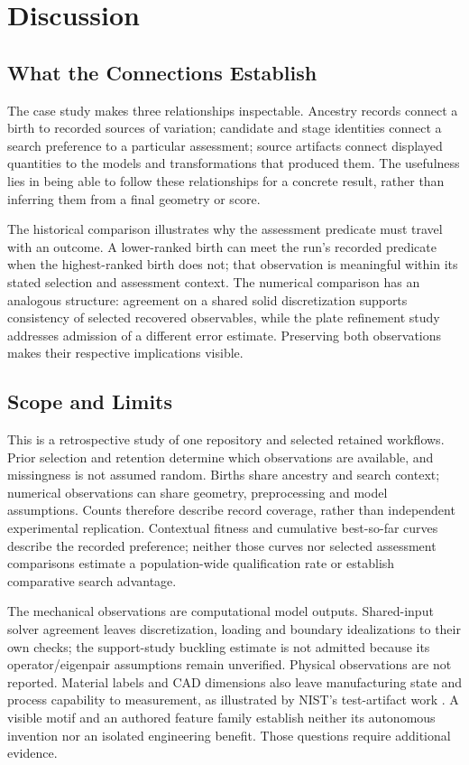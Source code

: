 \section{Discussion}
\label{sec:discussion}
\subsection{What the Connections Establish}
The case study makes three relationships inspectable. Ancestry records connect a birth to recorded sources of variation; candidate and stage identities connect a search preference to a particular assessment; source artifacts connect displayed quantities to the models and transformations that produced them. The usefulness lies in being able to follow these relationships for a concrete result, rather than inferring them from a final geometry or score.

The historical comparison illustrates why the assessment predicate must travel with an outcome. A lower-ranked birth can meet the run's recorded predicate when the highest-ranked birth does not; that observation is meaningful within its stated selection and assessment context. The numerical comparison has an analogous structure: agreement on a shared solid discretization supports consistency of selected recovered observables, while the plate refinement study addresses admission of a different error estimate. Preserving both observations makes their respective implications visible.

\subsection{Scope and Limits}
This is a retrospective study of one repository and selected retained workflows. Prior selection and retention determine which observations are available, and missingness is not assumed random. Births share ancestry and search context; numerical observations can share geometry, preprocessing and model assumptions. Counts therefore describe record coverage, rather than independent experimental replication. Contextual fitness and cumulative best-so-far curves describe the recorded preference; neither those curves nor selected assessment comparisons estimate a population-wide qualification rate or establish comparative search advantage.

The mechanical observations are computational model outputs. Shared-input solver agreement leaves discretization, loading and boundary idealizations to their own checks; the support-study buckling estimate is not admitted because its operator/eigenpair assumptions remain unverified. Physical observations are not reported. Material labels and CAD dimensions also leave manufacturing state and process capability to measurement, as illustrated by NIST's test-artifact work \cite{nistartifact}. A visible motif and an authored feature family establish neither its autonomous invention nor an isolated engineering benefit. Those questions require additional evidence.

